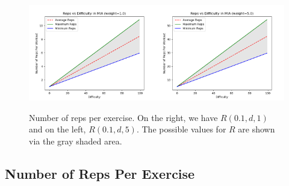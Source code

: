 \begin{figure}[h]
	\centering
	\includegraphics[width=0.5\textwidth]{Images/Rvd1.png}\includegraphics[width=0.5\textwidth]{Images/Rvd5.png}
	\caption{Number of reps per exercise. On the right, we have $R(0.1,d,1)$ and on the left, $R(0.1,d,5)$. The possible values for $R$ are shown via the gray shaded area.} \label{Rvd}
\end{figure}


\subsection{Number of Reps Per Exercise}

